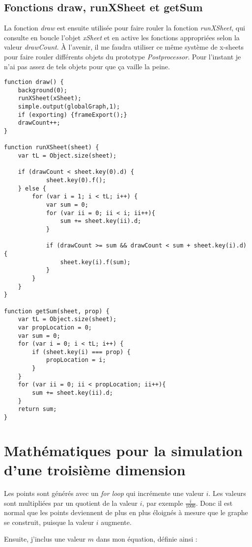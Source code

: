 \subsection{Fonctions draw, runXSheet et getSum}
La fonction \textit{draw} est ensuite utilisée pour faire rouler la fonction \textit{runXSheet}, qui consulte en boucle l'objet \textit{xSheet} et en active les fonctions appropriées selon la valeur \textit{drawCount}. À l'avenir, il me faudra utiliser ce même système de x-sheets pour faire rouler différents objets du prototype \textit{Postprocessor}. Pour l'instant je n'ai pas assez de tels objets pour que ça vaille la peine.
\begin{lstlisting}
function draw() {
    background(0);
    runXSheet(xSheet);
    simple.output(globalGraph,1);
    if (exporting) {frameExport();}
    drawCount++;
}

function runXSheet(sheet) {
    var tL = Object.size(sheet);

    if (drawCount < sheet.key(0).d) {
            sheet.key(0).f();
    } else {
        for (var i = 1; i < tL; i++) {
            var sum = 0;
            for (var ii = 0; ii < i; ii++){
                sum += sheet.key(ii).d; 
            }

            if (drawCount >= sum && drawCount < sum + sheet.key(i).d) {
                sheet.key(i).f(sum);
            }
        }
    }
}

function getSum(sheet, prop) {
    var tL = Object.size(sheet);
    var propLocation = 0;
    var sum = 0;
    for (var i = 0; i < tL; i++) {
        if (sheet.key(i) === prop) {
            propLocation = i;
        }
    }  
    for (var ii = 0; ii < propLocation; ii++){
        sum += sheet.key(ii).d;
    }
    return sum;
}

\end{lstlisting}


\section{Mathématiques pour la simulation d'une troisième dimension}

Les points sont générés avec un \textit{for loop} qui incrémente une valeur $i$. Les valeurs sont multipliées par un quotient de la valeur $i$, par exemple $\frac{i}{1000}$. Donc il est normal que les points deviennent de plus en plus éloignés à mesure que le graphe se construit, puisque la valeur $i$ augmente.

Ensuite, j'inclus une valeur $m$ dans mon équation, définie ainsi :

